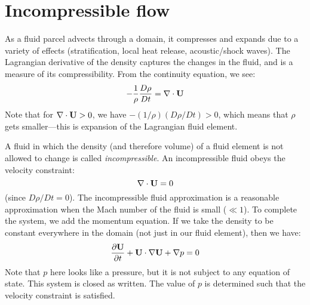 \label{ch:incompressible}

\section{Incompressible flow}

As a fluid parcel advects through a domain, it compresses and expands
due to a variety of effects (stratification, local heat release,
acoustic/shock waves).  The Lagrangian derivative of the density
captures the changes in the fluid, and is a measure of its compressibility.
From the continuity equation, we see:
\begin{equation}
-\frac{1}{\rho}\frac{D\rho}{Dt} = \nabla \cdot {\bf U}
\end{equation}
Note that for $\nabla \cdot {\bf U} > 0$, we have $-(1/\rho) (D\rho/Dt) > 0$,
which means that $\rho$ gets smaller---this is expansion of the Lagrangian
fluid element.

A fluid in which the density (and therefore volume) of a fluid element is not
allowed to change is called {\em incompressible}.  An incompressible
fluid obeys the velocity constraint:
\begin{equation}
\nabla \cdot {\bf U} = 0
\end{equation}
(since $D\rho / Dt = 0$).  The incompressible fluid approximation is 
a reasonable approximation when the Mach number of the fluid is small
($\ll 1$).  To complete the system, we add the momentum equation.  If 
we take the density to be constant everywhere in the domain (not just
in our fluid element), then we have:
\begin{equation}
\frac{\partial {\bf U}}{\partial t} + {\bf U} \cdot \nabla {\bf U} + \nabla p = 0
\end{equation}
Note that $p$ here looks like a pressure, but it is not subject to
any equation of state.  This system is closed as written.  The value
of $p$ is determined such that the velocity constraint is satisfied.

